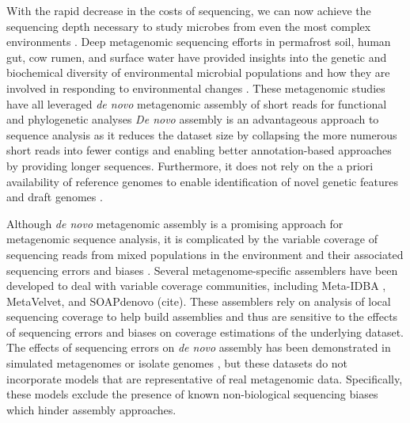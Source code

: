 \documentclass[10pt]{article}
\begin{document}
With the rapid decrease in the costs of sequencing, we can now
achieve the sequencing depth necessary to study microbes from even the most complex
environments \cite{Hess:2011p686,Qin:2010p189}.  Deep
metagenomic sequencing efforts in permafrost soil, human gut, cow
rumen, and surface water have provided insights into the genetic and
biochemical diversity of environmental microbial populations
\cite{Hess:2011p686,Iverson:2012p1281,Qin:2010p189} and how
they are involved in responding to environmental changes
\cite{Mackelprang:2011p1087}. These metagenomic studies have all
leveraged \emph{de novo} metagenomic assembly of short reads for
functional and phylogenetic analyses
\emph{De novo} assembly is
an advantageous approach to sequence analysis as it reduces the
dataset size by collapsing the more numerous short reads into fewer contigs and
enabling better annotation-based approaches by providing longer sequences.
\cite{Miller:2010p226,Pop:2009p798}
Furthermore, it does not rely on the a priori availability of
reference genomes to enable identification of novel genetic features
and draft genomes \cite{Hess:2011p686,Iverson:2012p1281}.

Although \emph{de novo} metagenomic assembly is a promising approach
for metagenomic sequence analysis, it is complicated by the variable
coverage of sequencing reads from mixed populations in the environment
and their associated sequencing errors and biases
\cite{Mende:2012p1262,Pignatelli:2011p742}. Several
metagenome-specific assemblers have been developed to deal with
variable coverage communities, including Meta-IDBA
\cite{Peng:2011p898}, MetaVelvet, and SOAPdenovo (cite).  These assemblers
rely on analysis of local sequencing coverage to help build assemblies
and thus are sensitive to the effects of sequencing errors and biases
on coverage estimations of the underlying dataset. The effects of
sequencing errors on \emph{de novo} assembly has been demonstrated in
simulated metagenomes
\cite{Mavromatis:2006p894,Mende:2012p1262,Pignatelli:2011p742} or
isolate genomes \cite{Morgan:2010p740}, but these datasets do not
incorporate models that are representative of real metagenomic data.
Specifically, these models exclude the presence of known
non-biological sequencing biases
\cite{GomezAlvarez:2009p1334,Keegan:2012p1336,Niu:2010p1333} which
hinder assembly approaches.
\end{document}
